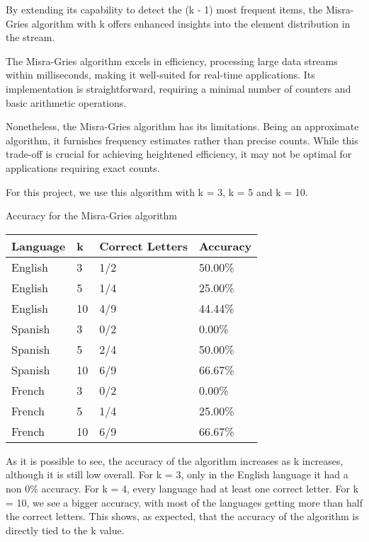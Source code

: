 \documentclass[]{revdetua}
\begin{document}
By extending its capability to detect the (k - 1) most frequent items, the Misra-Gries algorithm with k offers enhanced insights into the element distribution in the stream.

The Misra-Gries algorithm excels in efficiency, processing large data streams within milliseconds, making it well-suited for real-time applications. Its implementation is straightforward, requiring a minimal number of counters and basic arithmetic operations.

Nonetheless, the Misra-Gries algorithm has its limitations. Being an approximate algorithm, it furnishes frequency estimates rather than precise counts. While this trade-off is crucial for achieving heightened efficiency, it may not be optimal for applications requiring exact counts.

For this project, we use this algorithm with k = 3, k = 5 and k = 10.

\begin{table}[!ht]
    \centering
    Accuracy for the Misra-Gries algorithm
    \begin{tabular}{|l|l|l|l|}
    \hline
        Language & k & Correct Letters & Accuracy \\ \hline
        English & 3 & 1/2 & 50.00\% \\ \hline
        English & 5 & 1/4 & 25.00\% \\ \hline
        English & 10 & 4/9 & 44.44\% \\ \hline
        Spanish & 3 & 0/2 & 0.00\% \\ \hline
        Spanish & 5 & 2/4 & 50.00\% \\ \hline
        Spanish & 10 & 6/9 & 66.67\% \\ \hline
        French & 3 & 0/2 & 0.00\% \\ \hline
        French & 5 & 1/4 & 25.00\% \\ \hline
        French & 10 & 6/9 & 66.67\% \\ \hline
    \end{tabular}
\end{table}

As it is possible to see, the accuracy of the algorithm increases as k increases, although it is still low overall. For k = 3, only in the English language it had a non 0\% accuracy. For k = 4, every language had at least one correct letter. For k = 10, we see a bigger accuracy, with most of the languages getting more than half the correct letters. This shows, as expected, that the accuracy of the algorithm is directly tied to the k value. 
\end{document}
